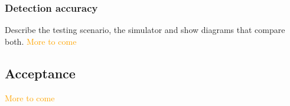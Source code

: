 \documentclass[prodmode,acmtosem]{acmsmall} %
\begin{document}


\subsubsection{Detection accuracy}
Describe the testing scenario, the simulator and show diagrams that compare both.
\textcolor{orange}{More to come}

\subsection{Acceptance}
\textcolor{orange}{More to come}




\end{document}
